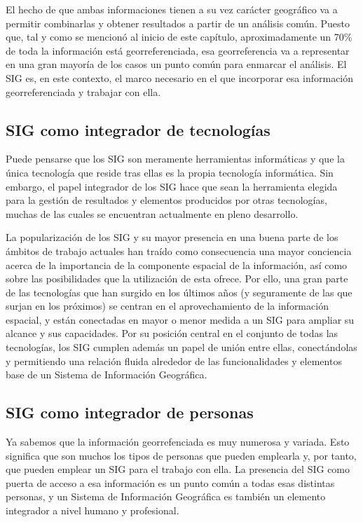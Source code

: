 El hecho de que ambas informaciones tienen a su vez carácter geográfico va a permitir combinarlas y obtener resultados a partir de un análisis común. Puesto que, tal y como se mencionó al inicio de este capítulo, aproximadamente un 70\% de toda la información está georreferenciada, esa georreferencia va a representar en una gran mayoría de los casos un punto común para enmarcar el análisis. El SIG es, en este contexto, el marco necesario en el que incorporar esa información georreferenciada y trabajar con ella.

\subsection{SIG como integrador de tecnologías}

Puede pensarse que los SIG son meramente herramientas informáticas y que la única tecnología que reside tras ellas es la propia tecnología informática. Sin embargo, el papel integrador de los SIG hace que sean la herramienta elegida para la gestión de resultados y elementos producidos por otras tecnologías, muchas de las cuales se encuentran actualmente en pleno desarrollo. 

La popularización de los SIG y su mayor presencia en una buena parte de los ámbitos de trabajo actuales han traído como consecuencia una mayor  conciencia acerca de la importancia de la componente espacial de la información, así como sobre las posibilidades que la utilización de esta ofrece. Por ello, una gran parte de las tecnologías que han surgido en los últimos años (y seguramente de las que surjan en los próximos) se centran en el aprovechamiento de la información espacial, y están conectadas en mayor o menor medida a un SIG para ampliar su alcance y sus capacidades. Por su posición central en el conjunto de todas las tecnologías, los SIG cumplen además un papel de unión entre ellas, conectándolas y permitiendo una relación fluida alrededor de las funcionalidades y elementos base de un Sistema de Información Geográfica.

\subsection{SIG como integrador de personas}

Ya sabemos que la información georrefenciada es muy numerosa y variada. Esto significa que son muchos los tipos de personas que pueden emplearla y, por tanto, que pueden emplear un SIG para el trabajo con ella. La presencia del SIG como puerta de acceso a esa información es un punto común a todas esas distintas personas, y un Sistema de Información Geográfica es también un elemento integrador a nivel humano y profesional.

